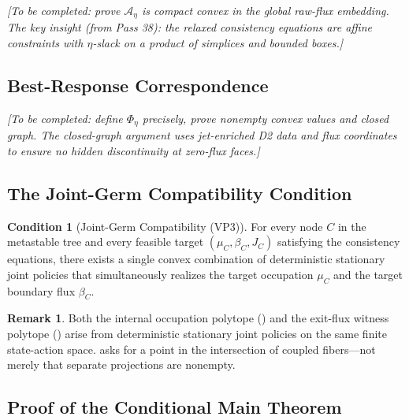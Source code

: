 \documentclass[12pt,a4paper]{article}
\theoremstyle{definition}
\newtheorem{remark}[theorem]{Remark}
\newtheorem{condition}[theorem]{Condition}
\begin{document}
\textit{[To be completed: prove $\mathcal{A}_\eta$ is compact convex in the global raw-flux embedding.  The key insight (from Pass 38): the relaxed consistency equations are affine constraints with $\eta$-slack on a product of simplices and bounded boxes.]}

\subsection{Best-Response Correspondence}

\textit{[To be completed: define $\Phi_\eta$ precisely, prove nonempty convex values and closed graph.  The closed-graph argument uses jet-enriched D2 data and flux coordinates to ensure no hidden discontinuity at zero-flux faces.]}

\subsection{The Joint-Germ Compatibility Condition}

\begin{condition}[Joint-Germ Compatibility (VP3)]
\label{cond:vp3}
For every node $C$ in the metastable tree and every feasible target $(\mu_C, \beta_C, J_C)$ satisfying the consistency equations, there exists a single convex combination of deterministic stationary joint policies that simultaneously realizes the target occupation $\mu_C$ and the target boundary flux $\beta_C$.
\end{condition}

\begin{remark}
Both the internal occupation polytope () and the exit-flux witness polytope () arise from deterministic stationary joint policies on the same finite state-action space.   asks for a point in the intersection of coupled fibers---not merely that separate projections are nonempty.
\end{remark}

\subsection{Proof of the Conditional Main Theorem}
\end{document}
